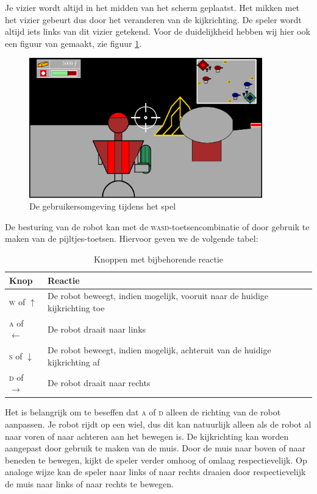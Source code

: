     Je vizier wordt altijd in het midden van het scherm geplaatst. Het mikken met het vizier gebeurt dus door het veranderen van de kijkrichting. De speler wordt altijd iets links van dit vizier getekend. Voor de duidelijkheid hebben wij hier ook een figuur van gemaakt, zie figuur \ref{fig:UI}.
    \begin{figure}[H]
    \includegraphics[width=0.9\textwidth]{../Graphics/UI.eps}
    \caption{De gebruikersomgeving tijdens het spel}
    \label{fig:UI}
    \end{figure}
    De besturing van de robot kan met de \textsc{wasd}-toetsencombinatie of door gebruik te maken van de pijltjes-toetsen. Hiervoor geven we de volgende tabel:
    \begin{table}[H]
        \small
        \centering
        \begin{tabular}{| l | l |}
        \hline
        Knop & Reactie \\ \hline
        \textsc{w} of $\uparrow$ & De robot beweegt, indien mogelijk, vooruit naar de huidige kijkrichting toe \\ \hline
        \textsc{a} of $\leftarrow$ & De robot draait naar links \\ \hline
        \textsc{s} of $\downarrow$ & De robot beweegt, indien mogelijk, achteruit van de huidige kijkrichting af \\ \hline
        \textsc{d} of $\rightarrow$ & De robot draait naar rechts \\ \hline
        \end{tabular}
        \caption{Knoppen met bijbehorende reactie}
        \label{tab:planning}
    \end{table}

    Het is belangrijk om te beseffen dat \textsc{a} of \textsc{d} alleen de richting van de robot aanpassen. Je robot rijdt op een wiel, dus dit kan natuurlijk alleen als de robot al naar voren of naar achteren aan het bewegen is. De kijkrichting kan worden aangepast door gebruik te maken van de muis. Door de muis naar boven of naar beneden te bewegen, kijkt de speler verder omhoog of omlaag respectievelijk. Op analoge wijze kan de speler naar links of naar rechts draaien door respectievelijk de muis naar links of naar rechts te bewegen.

